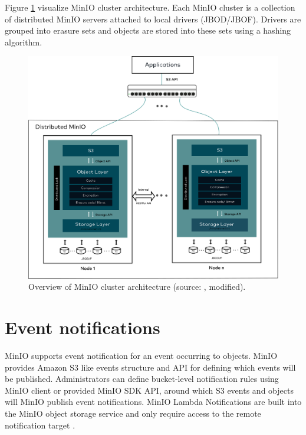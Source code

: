    Figure \ref{fig:minio-architecture} visualize MinIO cluster architecture. Each MinIO cluster is a collection of distributed MinIO servers attached to local drivers (JBOD/JBOF). Drivers are grouped into erasure sets and objects are stored into these sets using a hashing algorithm\cite{minioObjectStorage}.

    \begin{figure}[H]
        \centering
        \includegraphics[angle=90, height=0.75\textheight]{obrazky-figures/minio-architecture.eps}
        \caption{Overview of MinIO cluster architecture (source: \cite{minioObjectStorage}, modified).}
        \label{fig:minio-architecture}
    \end{figure}
    \newpage


    \section{Event notifications}
    MinIO supports event notification for an event occurring to objects. MinIO provides Amazon S3 like events structure and API for defining which events will be published. Administrators can define bucket-level notification rules using MinIO client or provided MinIO SDK API, around which S3 events and objects will MinIO publish event notifications. MinIO Lambda Notifications are built into the MinIO object storage service and only require access to the remote notification target \cite{minioMonitoring}.

